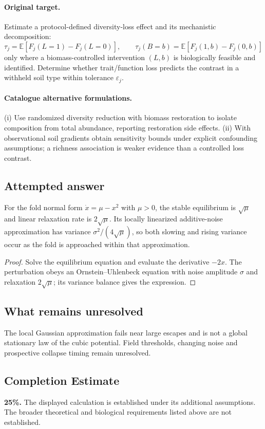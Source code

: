 \documentclass[11pt]{article}
\begin{document}
\paragraph{Original target.}
Estimate a protocol-defined diversity-loss effect and its mechanistic decomposition:
\[
 \tau_j=\mathbb{E}[F_j(L=1)-F_j(L=0)],\qquad
 \tau_j(B=b)=\mathbb{E}[F_j(1,b)-F_j(0,b)]
\]
only where a biomass-controlled intervention $(L,b)$ is biologically feasible and identified. Determine whether trait/function loss predicts the contrast in a withheld soil type within tolerance $\varepsilon_j$.
\paragraph{Catalogue alternative formulations.}
(i) Use randomized diversity reduction with biomass restoration to isolate composition from total abundance, reporting restoration side effects. (ii) With observational soil gradients obtain sensitivity bounds under explicit confounding assumptions; a richness association is weaker evidence than a controlled loss contrast.
\subsection{Attempted answer}
\begin{proposition}
For the fold normal form $\dot x=\mu-x^2$ with $\mu>0$, the stable equilibrium is $\sqrt\mu$ and linear relaxation rate is $2\sqrt\mu$. Its locally linearized additive-noise approximation has variance $\sigma^2/(4\sqrt\mu)$, so both slowing and rising variance occur as the fold is approached within that approximation.
\end{proposition}
\begin{proof}
Solve the equilibrium equation and evaluate the derivative $-2x$. The perturbation obeys an Ornstein--Uhlenbeck equation with noise amplitude $\sigma$ and relaxation $2\sqrt\mu$; its variance balance gives the expression.
\end{proof}
\subsection{What remains unresolved}
The local Gaussian approximation fails near large escapes and is not a global stationary law of the cubic potential. Field thresholds, changing noise and prospective collapse timing remain unresolved.
\subsection{Completion Estimate}
\textbf{25\%.} The displayed calculation is established under its additional assumptions. The broader theoretical and biological requirements listed above are not established.
\end{document}
